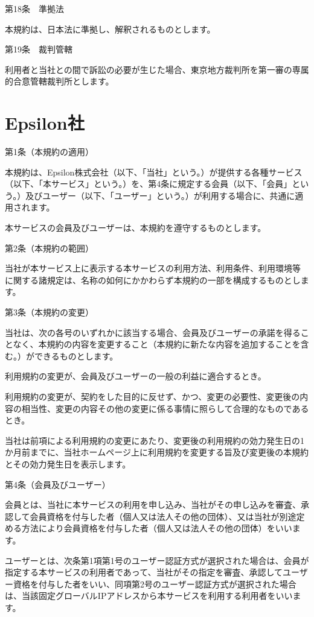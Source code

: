 第18条　準拠法

    本規約は、日本法に準拠し、解釈されるものとします。

第19条　裁判管轄

    利用者と当社との間で訴訟の必要が生じた場合、東京地方裁判所を第一審の専属的合意管轄裁判所とします。

\section{Epsilon社}
第1条（本規約の適用）

    本規約は、Epsilon株式会社（以下、「当社」という。）が提供する各種サービス（以下、「本サービス」という。）を、第4条に規定する会員（以下、「会員」という。）及びユーザー（以下、「ユーザー」という。）が利用する場合に、共通に適用されます。

    本サービスの会員及びユーザーは、本規約を遵守するものとします。

第2条（本規約の範囲）

    当社が本サービス上に表示する本サービスの利用方法、利用条件、利用環境等 に関する諸規定は、名称の如何にかかわらず本規約の一部を構成するものとします。

第3条（本規約の変更）

    当社は、次の各号のいずれかに該当する場合、会員及びユーザーの承諾を得ることなく、本規約の内容を変更すること（本規約に新たな内容を追加することを含む。）ができるものとします。

        利用規約の変更が、会員及びユーザーの一般の利益に適合するとき。

        利用規約の変更が、契約をした目的に反せず、かつ、変更の必要性、変更後の内容の相当性、変更の内容その他の変更に係る事情に照らして合理的なものであるとき。

    当社は前項による利用規約の変更にあたり、変更後の利用規約の効力発生日の1か月前までに、当社ホームページ上に利用規約を変更する旨及び変更後の本規約とその効力発生日を表示します。

第4条（会員及びユーザー）

    会員とは、当社に本サービスの利用を申し込み、当社がその申し込みを審査、承認して会員資格を付与した者（個人又は法人その他の団体）、又は当社が別途定める方法により会員資格を付与した者（個人又は法人その他の団体）をいいます。

    ユーザーとは、次条第1項第1号のユーザー認証方式が選択された場合は、会員が指定する本サービスの利用者であって、当社がその指定を審査、承認してユーザー資格を付与した者をいい、同項第2号のユーザー認証方式が選択された場合は、当該固定グローバルIPアドレスから本サービスを利用する利用者をいいます。

